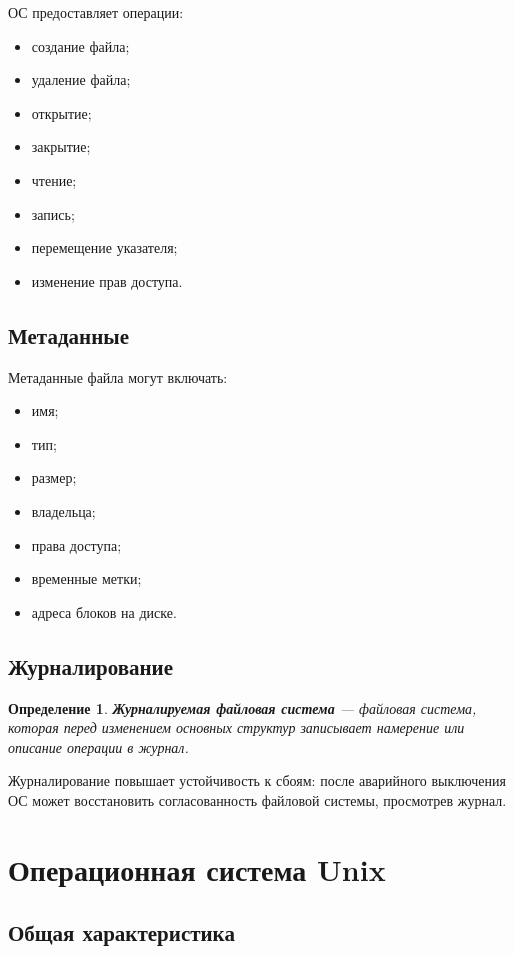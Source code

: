 \documentclass[12pt,a4paper]{article}
\newtheorem{definition}{Определение}
\begin{document}
ОС предоставляет операции:

\begin{itemize}
    \item создание файла;
    \item удаление файла;
    \item открытие;
    \item закрытие;
    \item чтение;
    \item запись;
    \item перемещение указателя;
    \item изменение прав доступа.
\end{itemize}

\subsection{Метаданные}

Метаданные файла могут включать:

\begin{itemize}
    \item имя;
    \item тип;
    \item размер;
    \item владельца;
    \item права доступа;
    \item временные метки;
    \item адреса блоков на диске.
\end{itemize}

\subsection{Журналирование}

\begin{definition}
\textbf{Журналируемая файловая система} --- файловая система, которая перед изменением основных структур записывает намерение или описание операции в журнал.
\end{definition}

Журналирование повышает устойчивость к сбоям: после аварийного выключения ОС может восстановить согласованность файловой системы, просмотрев журнал.

\section{Операционная система Unix}

\subsection{Общая характеристика}
\end{document}
